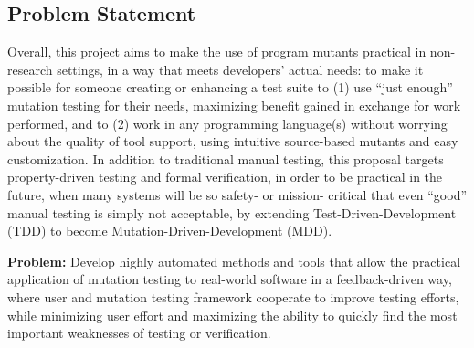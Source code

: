 
\subsection{Problem Statement}

Overall, this project aims to make the use of program mutants practical in
non-research settings, in a way that meets developers' actual needs: to make it
possible for someone creating or enhancing a test suite to (1) use ``just
enough'' mutation testing for their needs, maximizing benefit gained in exchange
for work performed, and to (2) work in any programming language(s) without worrying
about the quality of tool support, using intuitive source-based
mutants and easy customization. 
In addition to traditional manual testing, this proposal targets
property-driven testing and formal verification, in
order to be practical in the future, when many systems will be so
safety- or mission- critical that even ``good'' manual testing is simply not 
acceptable, by extending Test-Driven-Development (TDD) to become
Mutation-Driven-Development (MDD).


\begin{framed} {\bf Problem:} Develop highly automated methods and tools that
  allow the practical application of mutation testing to real-world software in
  a feedback-driven way, where user and mutation testing framework cooperate to
  improve testing efforts, while minimizing user effort and maximizing the
  ability to quickly find the most important weaknesses of testing or
  verification.
\end{framed}



